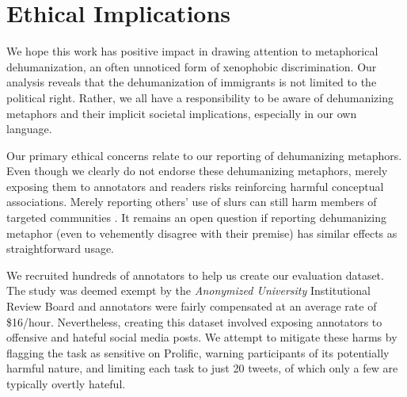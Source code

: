 \section{Ethical Implications}

We hope this work has positive impact in drawing attention to metaphorical dehumanization, an often unnoticed form of xenophobic discrimination. Our analysis reveals that the dehumanization of immigrants is not limited to the political right. Rather, we all have a responsibility to be aware of dehumanizing metaphors and their implicit societal implications, especially in our own language.

Our primary ethical concerns relate to our reporting of dehumanizing metaphors. Even though we clearly do not endorse these dehumanizing metaphors, merely exposing them to annotators and readers risks reinforcing harmful conceptual associations. Merely reporting others' use of slurs can still harm members of targeted communities \citep{croom2011slurs}. It remains an open question if reporting dehumanizing metaphor (even to vehemently disagree with their premise) has similar effects as straightforward usage.  

We recruited hundreds of annotators to help us create our evaluation dataset. The study was deemed exempt by the \textit{Anonymized University} Institutional Review Board and annotators were fairly compensated at an average rate of \$16/hour. Nevertheless, creating this dataset involved exposing annotators to offensive and hateful social media posts. We attempt to mitigate these harms by flagging the task as sensitive on Prolific, warning participants of its potentially harmful nature, and limiting each task to just 20 tweets, of which only a few are typically overtly hateful.